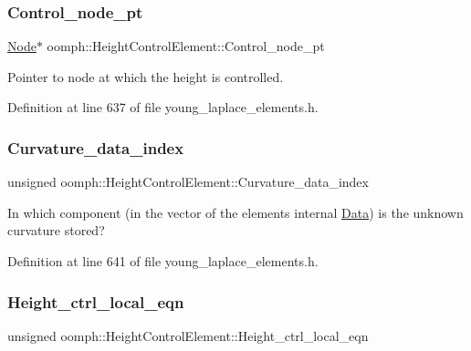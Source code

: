 \subsubsection{\texorpdfstring{Control\+\_\+node\+\_\+pt}{Control\_node\_pt}}
{\footnotesize\ttfamily \hyperlink{classoomph_1_1Node}{Node}$\ast$ oomph\+::\+Height\+Control\+Element\+::\+Control\+\_\+node\+\_\+pt\hspace{0.3cm}{\ttfamily [private]}}



Pointer to node at which the height is controlled. 



Definition at line 637 of file young\+\_\+laplace\+\_\+elements.\+h.

\mbox{\label{classoomph_1_1HeightControlElement_a2e03540694fb3d599770106ca460281e}} 
\subsubsection{\texorpdfstring{Curvature\+\_\+data\+\_\+index}{Curvature\_data\_index}}
{\footnotesize\ttfamily unsigned oomph\+::\+Height\+Control\+Element\+::\+Curvature\+\_\+data\+\_\+index\hspace{0.3cm}{\ttfamily [private]}}



In which component (in the vector of the element\textquotesingle{}s internal \hyperlink{classoomph_1_1Data}{Data}) is the unknown curvature stored? 



Definition at line 641 of file young\+\_\+laplace\+\_\+elements.\+h.

\mbox{\label{classoomph_1_1HeightControlElement_adbcff51a8787697ba2179442b9c2a753}} 
\subsubsection{\texorpdfstring{Height\+\_\+ctrl\+\_\+local\+\_\+eqn}{Height\_ctrl\_local\_eqn}}
{\footnotesize\ttfamily unsigned oomph\+::\+Height\+Control\+Element\+::\+Height\+\_\+ctrl\+\_\+local\+\_\+eqn\hspace{0.3cm}{\ttfamily [private]}}



